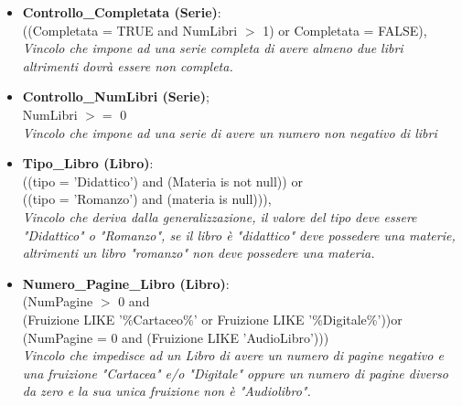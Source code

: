 \begin{itemize}
\begin{itemize}
                \item {\bf Controllo\_Completata (Serie)}: \\((Completata = TRUE and NumLibri $>$ 1) or Completata = FALSE),
                 \\\textit{Vincolo che impone ad una serie completa di avere almeno due libri altrimenti dovrà essere non completa.}

                \item {\bf Controllo\_NumLibri (Serie)}; \\NumLibri $>=$ 0
                 \\\textit{Vincolo che impone ad una serie di avere un numero non negativo di libri}
                
                \item {\bf Tipo\_Libro (Libro)}:\\ ((tipo = 'Didattico') and  (Materia is not null)) or \\((tipo = 'Romanzo') and (materia is null))),
                 \\\textit{Vincolo che deriva dalla generalizzazione, il  valore del tipo deve essere "Didattico" o "Romanzo", se il libro è "didattico" deve possedere una materie, altrimenti un libro "romanzo" non deve possedere una materia. }

                \item  {\bf Numero\_Pagine\_Libro (Libro)}:\\ (NumPagine $>$ 0 and \\(Fruizione LIKE '\%Cartaceo\%' or Fruizione LIKE '\%Digitale\%'))or\\(NumPagine = 0 and (Fruizione LIKE 'AudioLibro')))
                 \\\textit{Vincolo che impedisce ad un Libro di avere un numero di pagine negativo e una fruizione "Cartacea" e/o "Digitale" oppure un numero di pagine diverso da zero e la sua unica fruizione non è "Audiolibro".}

            \end{itemize}
    \end{itemize}
  
     

        
       
  
    

    \newpage
